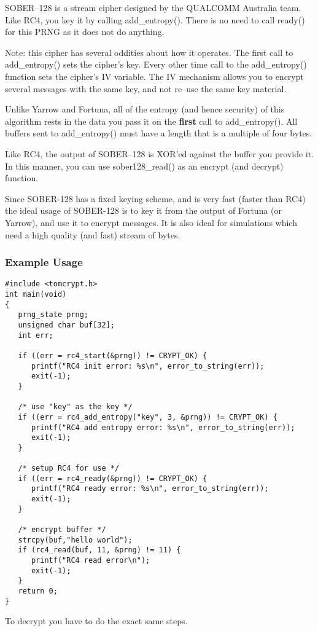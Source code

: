 \documentclass[synpaper]{book}
\begin{document}
SOBER--128 is a stream cipher designed by the QUALCOMM Australia team.  Like RC4, you key it by
calling add\_entropy().  There is no need to call ready() for this PRNG as it does not do anything.

Note: this cipher has several oddities about how it operates.  The first call to add\_entropy() sets the cipher's key.
Every other time call to the add\_entropy() function sets the cipher's IV variable.  The IV mechanism allows you to
encrypt several messages with the same key, and not re--use the same key material.

Unlike Yarrow and Fortuna, all of the entropy (and hence security) of this algorithm rests in the data
you pass it on the \textbf{first} call to add\_entropy().  All buffers sent to add\_entropy() must have a length
that is a multiple of four bytes.

Like RC4, the output of SOBER--128 is XOR'ed against the buffer you provide it.  In this manner, you can use
sober128\_read() as an encrypt (and decrypt) function.

Since SOBER-128 has a fixed keying scheme, and is very fast (faster than RC4) the ideal usage of SOBER-128 is to
key it from the output of Fortuna (or Yarrow), and use it to encrypt messages.  It is also ideal for
simulations which need a high quality (and fast) stream of bytes.

\subsubsection{Example Usage}
\begin{small}
\begin{verbatim}
#include <tomcrypt.h>
int main(void)
{
   prng_state prng;
   unsigned char buf[32];
   int err;

   if ((err = rc4_start(&prng)) != CRYPT_OK) {
      printf("RC4 init error: %s\n", error_to_string(err));
      exit(-1);
   }

   /* use "key" as the key */
   if ((err = rc4_add_entropy("key", 3, &prng)) != CRYPT_OK) {
      printf("RC4 add entropy error: %s\n", error_to_string(err));
      exit(-1);
   }

   /* setup RC4 for use */
   if ((err = rc4_ready(&prng)) != CRYPT_OK) {
      printf("RC4 ready error: %s\n", error_to_string(err));
      exit(-1);
   }

   /* encrypt buffer */
   strcpy(buf,"hello world");
   if (rc4_read(buf, 11, &prng) != 11) {
      printf("RC4 read error\n");
      exit(-1);
   }
   return 0;
}
\end{verbatim}
\end{small}
To decrypt you have to do the exact same steps.
\end{document}
